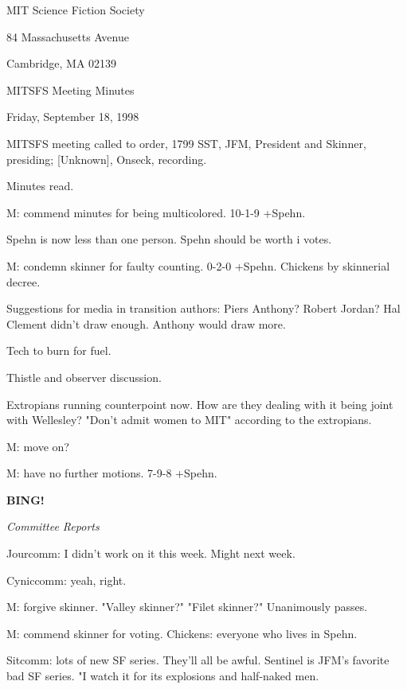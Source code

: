 \documentclass[12pt]{article}
\newcommand{\bing}{{\bf BING!} }
\newcommand{\goto}[1]{\bing \vskip 12pt \centerline{{\em{#1}}}}
\begin{document}
\begin{center}

MIT Science Fiction Society 

84 Massachusetts Avenue

Cambridge, MA 02139

\vspace{12pt}

MITSFS Meeting Minutes 

Friday, September 18, 1998

\end{center}
 
\vspace{18pt}

\setlength{\parskip}{6pt}

\noindent
MITSFS meeting called to order, 1799 SST,
JFM, President and Skinner, presiding; [Unknown], Onseck, recording.

Minutes read.

M: commend minutes for being multicolored. 10-1-9 +Spehn.

Spehn is now less than one person. Spehn should be worth i votes.

M: condemn skinner for faulty counting. 0-2-0 +Spehn. Chickens by skinnerial decree.

Suggestions for media in transition authors: Piers Anthony? Robert Jordan? Hal Clement didn't draw enough. Anthony would draw more.

Tech to burn for fuel.

Thistle and observer discussion.

Extropians running counterpoint now. How are they dealing with it being joint with Wellesley? "Don't admit women to MIT" according to the extropians.

M: move on?

M: have no further motions. 7-9-8 +Spehn.

\goto{Committee Reports}

Jourcomm: I didn't work on it this week. Might next week.

Cyniccomm: yeah, right.

M: forgive skinner. "Valley skinner?" "Filet skinner?" Unanimously passes.

M: commend skinner for voting. Chickens: everyone who lives in Spehn.

Sitcomm: lots of new SF series. They'll all be awful. Sentinel is JFM's favorite bad SF series. "I watch it for its explosions and half-naked men.
\end{document}

